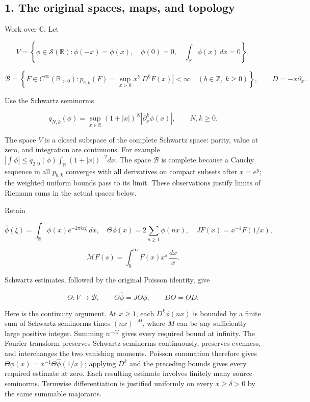 \documentclass[10pt,a4paper,oneside]{report}
\begin{document}
\subsection{1. The original spaces, maps, and
topology}\label{proof04:the-original-spaces-maps-and-topology}

Work over \(\mathbb C\). Let

\[
V=\left\{\phi\in\mathcal S(\mathbb R):
\phi(-x)=\phi(x),\quad \phi(0)=0,\quad
\int_{\mathbb R}\phi(x)\,dx=0\right\},
\]

\[
\mathscr B=\left\{F\in C^\infty(\mathbb R_{>0}):
p_{b,k}(F)=\sup_{x>0}x^b|D^kF(x)|<\infty
\quad(b\in\mathbb Z,\ k\geq0)\right\},\qquad D=-x\partial_x.
\]

Use the Schwartz seminorms

\[q_{N,k}(\phi)=\sup_{x\in\mathbb R}(1+|x|)^N|\partial_x^k\phi(x)|,
\qquad N,k\geq0.\]

The space \(V\) is a closed subspace of the complete Schwartz space:
parity, value at zero, and integration are continuous. For example
\(|\int\phi|\leq q_{2,0}(\phi)\int_{\mathbb R}(1+|x|)^{-2}dx\). The
space \(\mathscr B\) is complete because a Cauchy sequence in all
\(p_{b,k}\) converges with all derivatives on compact subsets after
\(x=e^y\); the weighted uniform bounds pass to its limit. These
observations justify limits of Riemann sums in the actual spaces below.

Retain

\[
\widehat\phi(\xi)=\int_{\mathbb R}\phi(x)e^{-2\pi ix\xi}\,dx,
\quad \Theta\phi(x)=2\sum_{n\geq1}\phi(nx),
\quad JF(x)=x^{-1}F(1/x),
\]

\[\mathcal MF(s)=\int_0^\infty F(x)x^s\,\frac{dx}{x}.\]

Schwartz estimates, followed by the original Poisson identity, give

\[\Theta:V\longrightarrow\mathscr B,\qquad
\Theta\widehat\phi=J\Theta\phi,\qquad D\Theta=\Theta D.\]

Here is the continuity argument. At \(x\geq1\), each \(D^k\phi(nx)\) is
bounded by a finite sum of Schwartz seminorms times \((nx)^{-M}\), where
\(M\) can be any sufficiently large positive integer. Summing \(n^{-M}\)
gives every required bound at infinity. The Fourier transform preserves
Schwartz seminorms continuously, preserves evenness, and interchanges
the two vanishing moments. Poisson summation therefore gives
\(\Theta\phi(x)=x^{-1}\Theta\widehat\phi(1/x)\); applying \(D^k\) and
the preceding bounds gives every required estimate at zero. Each
resulting estimate involves finitely many source seminorms. Termwise
differentiation is justified uniformly on every \(x\geq\delta>0\) by the
same summable majorants.
\end{document}
